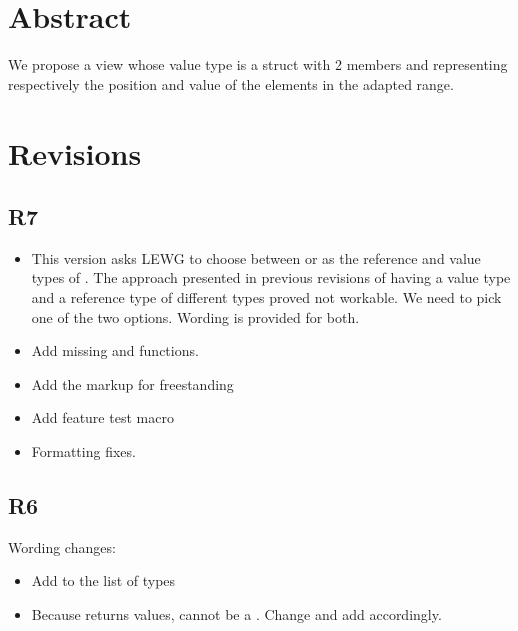 \documentclass{wg21}
\title{\tcode{views::enumerate}}
\author{Corentin Jabot}{corentin.jabot@gmail.com}
\begin{document}
\maketitle
{}

\section{Abstract}

We propose a view  whose value type is a struct with 2 members  and 
representing respectively the position and value of the elements in the adapted range.

\section{Revisions}

\subsection{R7}
\begin{itemize}
    \item This version asks LEWG to choose between  or  as the reference and value types of .
    The approach presented in previous revisions of having a value type and a reference type of different types proved not workable.
    We need to pick one of the two options. Wording is provided for both.

    \item Add missing  and  functions.
    \item Add the markup for freestanding
    \item Add feature test macro
    \item Formatting fixes.
\end{itemize}

\subsection{R6}
Wording changes:
\begin{itemize}
    \item Add  to the list of  types
    \item Because  returns values,  
    cannot be a . Change  and add  accordingly.
\end{itemize}
\end{document}
